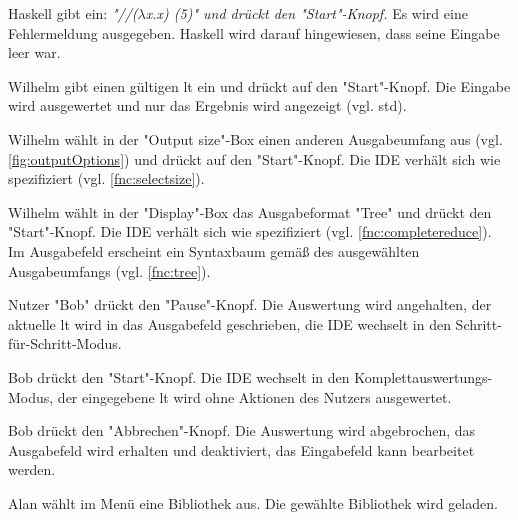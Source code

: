 \documentclass[parskip=full,11pt,twoside]{scrartcl}
\begin{document}
{Haskell gibt ein: \emph{"//($\lambda$x.x) (5)" und drückt den "Start"-Knopf.}
{Es wird eine Fehlermeldung ausgegeben.
 Haskell wird darauf hingewiesen, dass seine Eingabe leer war.} 


{Wilhelm gibt einen gültigen \gls{lt} ein und drückt auf den "Start"-Knopf. }
{Die Eingabe wird ausgewertet und nur das Ergebnis wird angezeigt (vgl. \gls{std}).}

{Wilhelm wählt in der "Output size"-Box einen anderen Ausgabeumfang aus (vgl. \ref{fig:outputOptions}) und drückt auf den "Start"-Knopf.}
{Die IDE verhält sich wie spezifiziert (vgl. \ref{fnc:selectsize}).}

{Wilhelm wählt in der "Display"-Box das Ausgabeformat "Tree" und drückt den "Start"-Knopf.}
{Die IDE verhält sich wie spezifiziert (vgl. \ref{fnc:completereduce}).
 Im Ausgabefeld erscheint ein Syntaxbaum gemäß des ausgewählten Ausgabeumfangs (vgl. \ref{fnc:tree}).}
 

{Nutzer "Bob" drückt den "Pause"-Knopf.}
{Die Auswertung wird angehalten, der aktuelle \gls{lt} wird in das Ausgabefeld geschrieben, die IDE wechselt in den Schritt-für-Schritt-Modus.}

{Bob drückt den "Start"-Knopf.}
{Die IDE wechselt in den Komplettauswertungs-Modus, der eingegebene \gls{lt} wird ohne Aktionen des Nutzers ausgewertet.}

{Bob drückt den "Abbrechen"-Knopf.}
{Die Auswertung wird abgebrochen, das Ausgabefeld wird erhalten und deaktiviert, das Eingabefeld kann bearbeitet werden.}
 

{Alan wählt im Menü eine Bibliothek aus.}
{Die gewählte Bibliothek wird geladen.}

}
\end{document}
